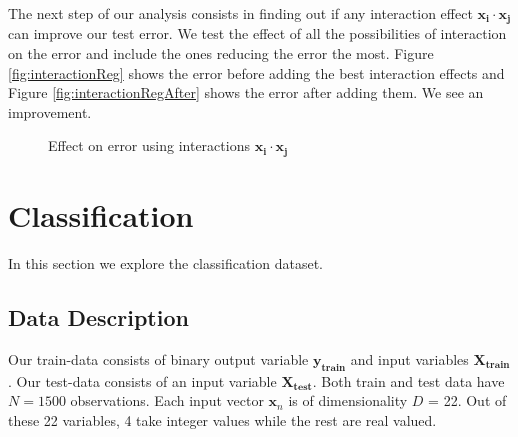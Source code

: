 \documentclass{article} %
\begin{document}
The next step of our analysis consists in finding out if any interaction effect $\mathbf{x_{i} \cdot x_{j}}$ can improve our test error. We test the effect of all the possibilities of interaction on the error and include the ones reducing the error the most. Figure \ref{fig:interactionReg} shows the error before adding the best interaction effects and Figure \ref{fig:interactionRegAfter} shows the error after adding them. We see an improvement.


\begin{figure}[!h]
\center
{}
\hfill
{}
\caption{Effect on error using interactions  $\mathbf{x_{i} \cdot x_{j}}$ }
\end{figure}


\section{Classification}

In this section we explore the classification dataset. 
\subsection{Data Description}
Our train-data consists of binary output variable $\mathbf{y_{train}}$ and input variables $\mathbf{X_{train}}$. Our test-data consists of an input variable $\mathbf{X_{test}}$. Both train and test data have $N=1500$ observations. Each input vector $\mathbf{x}_n$ is of dimensionality $D$ = 22. Out of these 22 variables, 4 take integer values while the rest are real valued.
\end{document}
